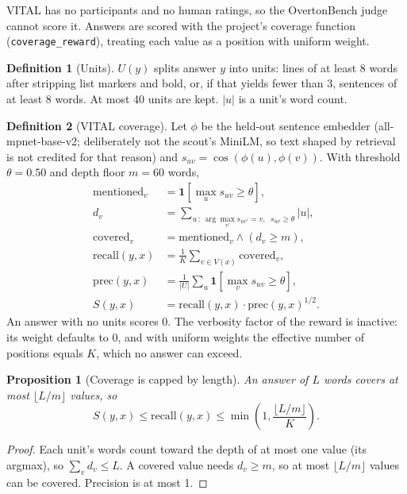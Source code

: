 \documentclass[11pt]{article}
\newtheorem{proposition}{Proposition}
\theoremstyle{definition}
\newtheorem{definition}{Definition}
\newcommand{\1}{\mathbf{1}}
\begin{document}
VITAL has no participants and no human ratings, so the OvertonBench judge cannot
score it. Answers are scored with the project's coverage function
(\texttt{coverage\_reward}), treating each value as a position with uniform
weight.

\begin{definition}[Units]
$U(y)$ splits answer $y$ into units: lines of at least 8 words after stripping
list markers and bold, or, if that yields fewer than 3, sentences of at least 8
words. At most 40 units are kept. $|u|$ is a unit's word count.
\end{definition}

\begin{definition}[VITAL coverage]
Let $\phi$ be the held-out sentence embedder (all-mpnet-base-v2; deliberately not
the scout's MiniLM, so text shaped by retrieval is not credited for that reason)
and $s_{uv} = \cos(\phi(u), \phi(v))$. With threshold $\theta = 0.50$ and depth
floor $m = 60$ words,
\begin{align*}
  \mathrm{mentioned}_v &= \1\!\left[\max_{u} s_{uv} \ge \theta\right],\\
  d_v &= \sum_{u \,:\, \arg\max_{v'} s_{uv'} = v,\;\; s_{uv} \ge \theta} |u|,\\
  \mathrm{covered}_v &= \mathrm{mentioned}_v \wedge (d_v \ge m),\\
  \mathrm{recall}(y, x) &= \tfrac{1}{K} \textstyle\sum_{v \in V(x)} \mathrm{covered}_v,\\
  \mathrm{prec}(y, x) &= \tfrac{1}{|U|} \textstyle\sum_{u} \1\!\left[\max_v s_{uv} \ge \theta\right],\\
  S(y, x) &= \mathrm{recall}(y, x) \cdot \mathrm{prec}(y, x)^{1/2}.
\end{align*}
An answer with no units scores 0. The verbosity factor of the reward is inactive:
its weight defaults to 0, and with uniform weights the effective number of
positions equals $K$, which no answer can exceed.
\end{definition}

\begin{proposition}[Coverage is capped by length]\label{prop:length}
An answer of $L$ words covers at most $\lfloor L / m \rfloor$ values, so
\[
  S(y, x) \le \mathrm{recall}(y, x) \le \min\!\left(1, \frac{\lfloor L/m \rfloor}{K}\right).
\]
\end{proposition}

\begin{proof}
Each unit's words count toward the depth of at most one value (its argmax), so
$\sum_v d_v \le L$. A covered value needs $d_v \ge m$, so at most $\lfloor L/m
\rfloor$ values can be covered. Precision is at most 1.
\end{proof}
\end{document}
